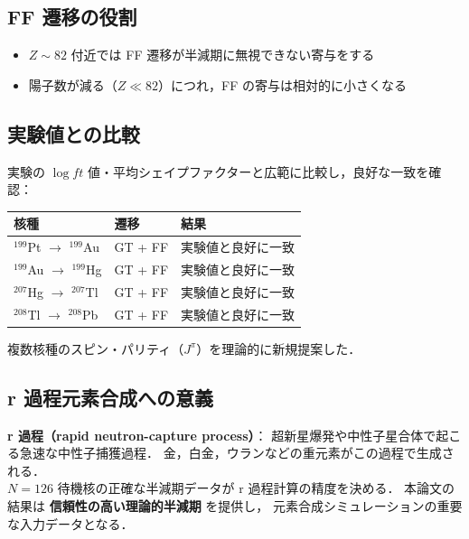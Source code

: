 \documentclass[12pt,a4paper]{ltjsarticle}
\begin{document}
\subsection{FF 遷移の役割}

\begin{itemize}
  \item $Z \sim 82$ 付近では FF 遷移が半減期に無視できない寄与をする
  \item 陽子数が減る（$Z \ll 82$）につれ，FF の寄与は相対的に小さくなる
\end{itemize}

\subsection{実験値との比較}

実験の $\log ft$ 値・平均シェイプファクターと広範に比較し，良好な一致を確認：

\begin{center}
\begin{tabular}{lll}
\toprule
核種 & 遷移 & 結果 \\
\midrule
$^{199}$Pt $\to$ $^{199}$Au & GT + FF & 実験値と良好に一致 \\
$^{199}$Au $\to$ $^{199}$Hg & GT + FF & 実験値と良好に一致 \\
$^{207}$Hg $\to$ $^{207}$Tl & GT + FF & 実験値と良好に一致 \\
$^{208}$Tl $\to$ $^{208}$Pb & GT + FF & 実験値と良好に一致 \\
\bottomrule
\end{tabular}
\end{center}

複数核種のスピン・パリティ（$J^\pi$）を理論的に新規提案した．

\subsection{r 過程元素合成への意義}

\begin{point}
\textbf{r 過程（rapid neutron-capture process）}：
超新星爆発や中性子星合体で起こる急速な中性子捕獲過程．
金，白金，ウランなどの重元素がこの過程で生成される．\\[4pt]
$N=126$ 待機核の正確な半減期データが r 過程計算の精度を決める．
本論文の結果は \textbf{信頼性の高い理論的半減期} を提供し，
元素合成シミュレーションの重要な入力データとなる．
\end{point}

\end{document}
